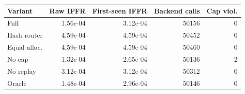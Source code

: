 \begin{tabular}{lrrrr}
\toprule
Variant & Raw IFFR & First-seen IFFR & Backend calls & Cap viol. \\
\midrule
Full & 1.56e-04 & 3.12e-04 & 50156 & 0 \\
Hash router & 4.59e-04 & 4.59e-04 & 50452 & 0 \\
Equal alloc. & 4.59e-04 & 4.59e-04 & 50460 & 0 \\
No cap & 1.32e-04 & 2.65e-04 & 50136 & 2 \\
No replay & 3.12e-04 & 3.12e-04 & 50312 & 0 \\
Oracle & 1.48e-04 & 2.96e-04 & 50146 & 0 \\
\bottomrule
\end{tabular}
